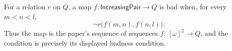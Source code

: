 \begin{definition}
For a relation $r$ on $Q$, a map
$f:\mathsf{IncreasingPair}\to Q$ is bad when, for every $m<n<l$,
\[
\neg r\bigl(f(m,n),f(n,l)\bigr).
\]
Thus the map is the paper's sequence of sequences
$f:\,[\omega]^2\to Q$, and the condition is precisely its displayed
badness condition.
\end{definition}
